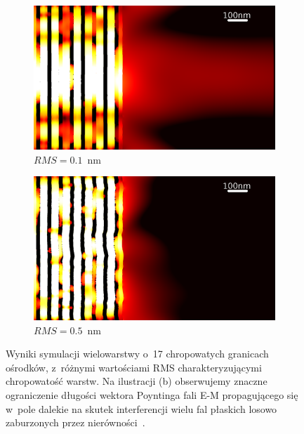 \begin{figure}[htb]
	\centering
	\begin{subfigure}[b]{.45\textwidth}
		\includegraphics[width=\textwidth]{images/multilayer/oer-rms01.png}
		\caption{$RMS=0.1$~nm}
	\end{subfigure}
	\begin{subfigure}[b]{.45\textwidth}
		\includegraphics[width=\textwidth]{images/multilayer/oer-rms05.png}
		\caption{$RMS=0.5$~nm}
	\end{subfigure}
	\caption{Wyniki symulacji wielowarstwy o~17 chropowatych granicach ośrodków, z~różnymi wartościami RMS charakteryzującymi chropowatość warstw. Na ilustracji (b) obserwujemy znaczne ograniczenie długości wektora Poyntinga fali E-M propagującego się w~pole dalekie na skutek interferencji wielu fal płaskich losowo zaburzonych przez nierówności~\cite{pastuszczak2013engineering}.}
	\label{fig:rmsem}
	
\end{figure}

